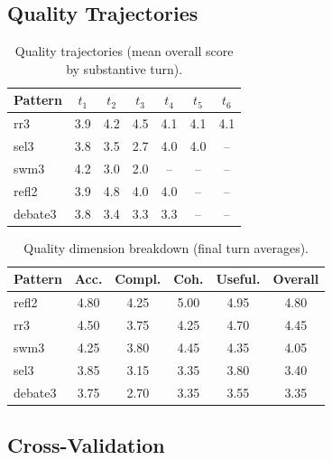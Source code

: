 \documentclass{article}
\begin{document}
\subsection{Quality Trajectories}

\begin{table}[H]
\centering
\caption{Quality trajectories (mean overall score by substantive turn).}
\label{tab:quality_traj}
{\small
\begin{tabular}{@{}lcccccc@{}}
\toprule
\textbf{Pattern} & $t_1$ & $t_2$ & $t_3$ & $t_4$ & $t_5$ & $t_6$ \\
\midrule
rr3 & 3.9 & 4.2 & 4.5 & 4.1 & 4.1 & 4.1 \\
sel3 & 3.8 & 3.5 & 2.7 & 4.0 & 4.0 & -- \\
swm3 & 4.2 & 3.0 & 2.0 & -- & -- & -- \\
refl2 & 3.9 & 4.8 & 4.0 & 4.0 & -- & -- \\
debate3 & 3.8 & 3.4 & 3.3 & 3.3 & -- & -- \\
\bottomrule
\end{tabular}
}
\end{table}

\begin{table}[H]
\centering
\caption{Quality dimension breakdown (final turn averages).}
\label{tab:quality_dims}
{\small
\begin{tabular}{@{}lccccc@{}}
\toprule
\textbf{Pattern} & \textbf{Acc.} & \textbf{Compl.} & \textbf{Coh.} & \textbf{Useful.} & \textbf{Overall} \\
\midrule
refl2 & 4.80 & 4.25 & 5.00 & 4.95 & 4.80 \\
rr3 & 4.50 & 3.75 & 4.25 & 4.70 & 4.45 \\
swm3 & 4.25 & 3.80 & 4.45 & 4.35 & 4.05 \\
sel3 & 3.85 & 3.15 & 3.35 & 3.80 & 3.40 \\
debate3 & 3.75 & 2.70 & 3.35 & 3.55 & 3.35 \\
\bottomrule
\end{tabular}
}
\end{table}

\subsection{Cross-Validation}
\end{document}
